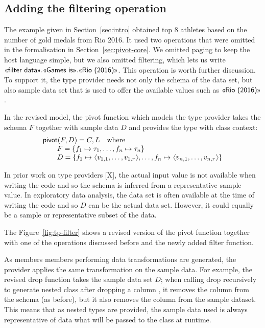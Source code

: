 \documentclass[a4paper,UKenglish]{lipics-v2016}
\theoremstyle{plain}
\theoremstyle{definition}
\newcommand{\vect}[1]{\langl #1 \rangl}
\newcommand{\langl}{\begin{picture}(4.5,7)
\put(1.1,2.5){\rotatebox{60}{\line(1,0){5.5}}}
\put(1.1,2.5){\rotatebox{300}{\line(1,0){5.5}}}
\end{picture}}
\newcommand{\rangl}{\begin{picture}(4.5,7)
\put(.9,2.5){\rotatebox{120}{\line(1,0){5.5}}}
\put(.9,2.5){\rotatebox{240}{\line(1,0){5.5}}}
\end{picture}}
\newcommand{\ball}[1]{\FPeval{\result}{clip(201+#1)}\textnormal{\ding{\result}}}
\newcommand{\ident}[1]{\textnormal{\sffamily #1}}
\newcommand{\qident}[1]{\textnormal{\sffamily \guillemotleft #1\guillemotright}}
\begin{document}

\subsection{Adding the filtering operation}
\label{sec:pivot-filter}

The example given in Section~\ref{sec:intro} obtained top 8 athletes based on the number
of gold medals from Rio 2016. It used two operations that were omitted in the formalisation in
Section~\ref{sec:pivot-core}. We omitted paging to keep the host language simple, but we also
omitted filtering, which lets us write $\qident{filter data}.\qident{Games is}.\qident{Rio (2016)}$.
This operation is worth further discussion. To support it, the type provider needs not only the
schema of the data set, but also sample data set that is used to offer the available values such 
as $\qident{Rio (2016)}$.

\noindent
In the revised model, the \ident{pivot} function which models the type provider takes the schema
$F$ together with sample data $D$ and provides the type with class context:
%
\begin{equation*}
\begin{array}{l}
\ident{pivot}(F, D) = C, L \quad \textnormal{where}\\
\qquad F=\{ f_1 \mapsto \tau_1, \ldots, f_n \mapsto \tau_n \}\\
\qquad D=\{ f_1\mapsto \vect{v_{1,1},\ldots,v_{1,r}}, \ldots, f_n\mapsto \vect{v_{n,1},\ldots,v_{n,r}}\} 
\end{array}
\end{equation*}

\noindent
In prior work on type providers [X], the actual input value is not available when writing the code
and so the schema is inferred from a representative sample value. In exploratory data analysis, the 
data set is often available at the time of writing the code and so $D$ can be the actual data set.
However, it could equally be a sample or representative subset of the data.

The Figure~\ref{fig:tp-filter} shows a revised version of the \ident{pivot} function \ball{1} 
together with one of the operations discussed before and the newly added \ident{filter} function. 

As members members performing data transformations are generated, the provider applies the same
transformation on the sample data. For example, the revised \ident{drop} function \ball{2} takes
the sample data set $D$; when calling \ident{drop} recursively to generate nested class after
dropping a column \ball{3}, it removes the column from the schema (as before), but it also removes
the column from the sample dataset. This means that as nested types are provided, the sample data
used is always representative of data what will be passed to the class at runtime. 
\end{document}
